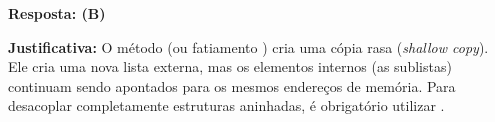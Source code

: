 \ifmostrarGabarito
\textbf{Resposta: (B)}

\textbf{Justificativa:}
O método  (ou fatiamento \code{[:]}) cria uma cópia rasa (\emph{shallow copy}). Ele cria uma nova lista externa, mas os elementos internos (as sublistas) continuam sendo apontados para os mesmos endereços de memória. Para desacoplar completamente estruturas aninhadas, é obrigatório utilizar .

\fi
